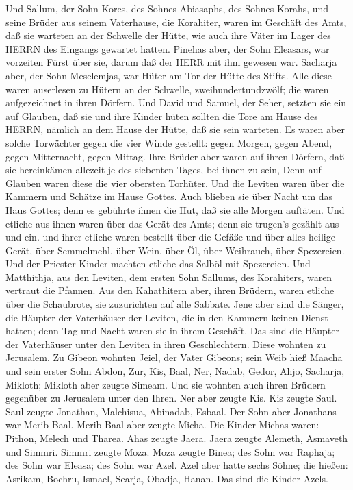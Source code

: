  Und Sallum, der Sohn Kores, des Sohnes Abiasaphs, des
Sohnes Korahs, und seine Brüder aus seinem Vaterhause, die Korahiter,
waren im Geschäft des Amts, daß sie warteten an der Schwelle der Hütte,
wie auch ihre Väter im Lager des HERRN des Eingangs gewartet hatten.
 Pinehas aber, der Sohn Eleasars, war vorzeiten Fürst über
sie, darum daß der HERR mit ihm gewesen war.  Sacharja
aber, der Sohn Meselemjas, war Hüter am Tor der Hütte des Stifts.
 Alle diese waren auserlesen zu Hütern an der Schwelle,
zweihundertundzwölf; die waren aufgezeichnet in ihren Dörfern. Und David
und Samuel, der Seher, setzten sie ein auf Glauben,  daß
sie und ihre Kinder hüten sollten die Tore am Hause des HERRN, nämlich
an dem Hause der Hütte, daß sie sein warteten.  Es waren
aber solche Torwächter gegen die vier Winde gestellt: gegen Morgen,
gegen Abend, gegen Mitternacht, gegen Mittag.  Ihre Brüder
aber waren auf ihren Dörfern, daß sie hereinkämen allezeit je des
siebenten Tages, bei ihnen zu sein,  Denn auf Glauben waren
diese die vier obersten Torhüter. Und die Leviten waren über die Kammern
und Schätze im Hause Gottes.  Auch blieben sie über Nacht
um das Haus Gottes; denn es gebührte ihnen die Hut, daß sie alle Morgen
auftäten.  Und etliche aus ihnen waren über das Gerät des
Amts; denn sie trugen's gezählt aus und ein.  und ihrer
etliche waren bestellt über die Gefäße und über alles heilige Gerät,
über Semmelmehl, über Wein, über Öl, über Weihrauch, über Spezereien.
 Und der Priester Kinder machten etliche das Salböl mit
Spezereien.  Und Matthithja, aus den Leviten, dem ersten
Sohn Sallums, des Korahiters, waren vertraut die Pfannen. 
Aus den Kahathitern aber, ihren Brüdern, waren etliche über die
Schaubrote, sie zuzurichten auf alle Sabbate.  Jene aber
sind die Sänger, die Häupter der Vaterhäuser der Leviten, die in den
Kammern keinen Dienst hatten; denn Tag und Nacht waren sie in ihrem
Geschäft.  Das sind die Häupter der Vaterhäuser unter den
Leviten in ihren Geschlechtern. Diese wohnten zu Jerusalem.
 Zu Gibeon wohnten Jeiel, der Vater Gibeons; sein Weib hieß
Maacha  und sein erster Sohn Abdon, Zur, Kis, Baal, Ner,
Nadab,  Gedor, Ahjo, Sacharja, Mikloth; 
Mikloth aber zeugte Simeam. Und sie wohnten auch ihren Brüdern gegenüber
zu Jerusalem unter den Ihren.  Ner aber zeugte Kis. Kis
zeugte Saul. Saul zeugte Jonathan, Malchisua, Abinadab, Esbaal.
 Der Sohn aber Jonathans war Merib-Baal. Merib-Baal aber
zeugte Micha.  Die Kinder Michas waren: Pithon, Melech und
Tharea.  Ahas zeugte Jaera. Jaera zeugte Alemeth, Asmaveth
und Simmri. Simmri zeugte Moza.  Moza zeugte Binea; des
Sohn war Raphaja; des Sohn war Eleasa; des Sohn war Azel. 
Azel aber hatte sechs Söhne; die hießen: Asrikam, Bochru, Ismael,
Searja, Obadja, Hanan. Das sind die Kinder Azels.


